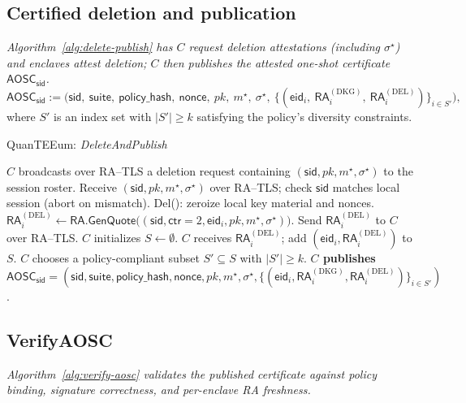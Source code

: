 \documentclass[runningheads,orivec]{llncs}
\newcommand{\prot}{\textsf{QuanTEEum}}
\newcommand{\sid}{\mathsf{sid}}
\begin{document}
\FloatBarrier

\subsection{Certified deletion and publication}
\emph{Algorithm~\ref{alg:delete-publish} has $C$ request deletion attestations (including $\sigma^{\star}$) and enclaves attest deletion; $C$ then publishes the attested one-shot certificate $\mathsf{AOSC}_\sid$.}
\smallskip
\[
\mathsf{AOSC}_\sid := \big(\sid,\ \mathsf{suite},\ \mathsf{policy\_hash},\ \mathsf{nonce},\ pk,\ m^{\star},\ \sigma^{\star},\ \{(\mathsf{eid}_i,\ \mathsf{RA}^{(\mathrm{DKG})}_i,\ \mathsf{RA}^{(\mathrm{DEL})}_i)\}_{i\in S'}\big),
\]
where $S'$ is an index set with $|S'|\ge k$ satisfying the policy’s diversity constraints.

\begin{algorithm}[H]
\caption{\prot{}: \emph{DeleteAndPublish}}
\label{alg:delete-publish}
\begin{small}
\begin{algorithmic}[1]
\State \textbf{$C$} broadcasts over RA--TLS a deletion request containing $(\sid,pk,m^{\star},\sigma^{\star})$ to the session roster.
  \State Receive $(\sid,pk,m^{\star},\sigma^{\star})$ over RA--TLS; check $\sid$ matches local session (abort on mismatch).
  \State \textsf{Del}(): zeroize local key material and nonces.
  \State $\mathsf{RA}^{(\mathrm{DEL})}_i \gets \textsf{RA.GenQuote}\big((\sid,\mathsf{ctr}{=}2,\mathsf{eid}_i,pk,m^{\star},\sigma^{\star})\big)$.
  \State Send $\mathsf{RA}^{(\mathrm{DEL})}_i$ to \textbf{$C$} over RA--TLS.
\EndFor
\State \textbf{$C$} initializes $S \gets \emptyset$.
  \State \textbf{$C$} receives $\mathsf{RA}^{(\mathrm{DEL})}_i$; add $(\mathsf{eid}_i,\mathsf{RA}^{(\mathrm{DEL})}_i)$ to $S$.
\EndFor
\State \textbf{$C$} chooses a policy-compliant subset $S' \subseteq S$ with $|S'|\ge k$.
\State \textbf{$C$ publishes} $\mathsf{AOSC}_\sid = (\sid,\mathsf{suite},\mathsf{policy\_hash},\mathsf{nonce},pk,m^{\star},\sigma^{\star},\{(\mathsf{eid}_i,\mathsf{RA}^{(\mathrm{DKG})}_i,\mathsf{RA}^{(\mathrm{DEL})}_i)\}_{i\in S'})$.
\end{algorithmic}
\end{small}
\end{algorithm}

\FloatBarrier

\subsection{VerifyAOSC}
\emph{Algorithm~\ref{alg:verify-aosc} validates the published certificate against policy binding, signature correctness, and per-enclave RA freshness.}
\end{document}
